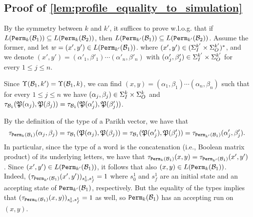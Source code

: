 \subsection{Proof of \autoref{lem:profile_equality_to_simulation}}
\label{apx:profile_equality_to_simulation}
	
	By the symmetry between $k$ and $k'$, it suffices to prove w.l.o.g. that if $L({\mathtt{Perm}}_{k}(\mathcal{B}_1))\subseteq L({\mathtt{Perm}}_{k}(\mathcal{B}_2))$, then $L({\mathtt{Perm}}_{k'}(\mathcal{B}_1))\subseteq L({\mathtt{Perm}}_{k'}(\mathcal{B}_2))$.
    Assume the former, and let $w=(x',y')\in L({\mathtt{Perm}}_{k'}(\mathcal{B}_1))$.
	where $(x',y')\in (\Sigma_{I}^{k'}\times \Sigma_{O}^{k'})^*$, and we denote $(x',y')=(\alpha'_1,\beta'_1)\cdots (\alpha'_n,\beta'_n)$ with $(\alpha'_j,\beta'_j)\in \Sigma_{I}^{k'}\times \Sigma_{O}^{k'}$ for every $1\le j\le n$. 
	
	Since $\Upsilon(\mathcal{B}_1,k')=\Upsilon(\mathcal{B}_1,k)$, we can find $(x,y)=(\alpha_1,\beta_1)\cdots (\alpha_n,\beta_n)$ such that for every $1\le j\le n$ we have $(\alpha_j,\beta_j)\in \Sigma_{I}^{k}\times \Sigma_{O}^{k}$ and $\tau_{\mathcal{B}_1}(\mathfrak{P}(\alpha_j),\mathfrak{P}(\beta_j))=\tau_{\mathcal{B}_1}(\mathfrak{P}(\alpha'_j),\mathfrak{P}(\beta'_j))$.
	
	By the definition of the type of a Parikh vector, we have that \[\tau_{{\mathtt{Perm}}_k(\mathcal{B}_1)}(\alpha_j,\beta_j)=\tau_{\mathcal{B}_1}(\mathfrak{P}(\alpha_j),\mathfrak{P}(\beta_j))=\tau_{\mathcal{B}_1}(\mathfrak{P}(\alpha'_j),\mathfrak{P}(\beta'_j))=\tau_{{\mathtt{Perm}}_{k'}(\mathcal{B}_1)}(\alpha'_j,\beta'_j).\]
	In particular, since the type of a word is the concatenation (i.e., Boolean matrix product) of its underlying letters, we have that $\tau_{{\mathtt{Perm}}_k(\mathcal{B}_1)}(x,y)=\tau_{{\mathtt{Perm}}_{k'}(\mathcal{B}_1)}(x',y')$. Since $(x',y')\in L({\mathtt{Perm}}_{k'}(\mathcal{B}_1))$, it follows that also $(x,y)\in L({\mathtt{Perm}}_{k}(\mathcal{B}_1))$. Indeed, 
	$(\tau_{{\mathtt{Perm}}_{k'}(\mathcal{B}_1)}(x',y'))_{s^1_0,s^1_f}=1$ where $s^1_0$ and $s^1_f$ are an initial state and an accepting state of ${\mathtt{Perm}}_{k'}(\mathcal{B}_1)$, respectively. But the equality of the types implies that $(\tau_{{\mathtt{Perm}}_{k}(\mathcal{B}_1)}(x,y))_{s^1_0,s^1_f}=1$ as well, so ${\mathtt{Perm}}_k(\mathcal{B}_1)$ has an accepting run on $(x,y)$.
	
